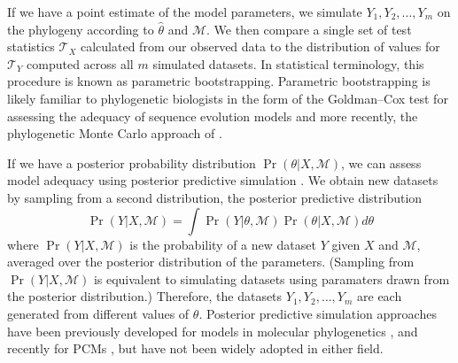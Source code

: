 \documentclass[a4paper,11pt]{article}
\begin{document}
If we have a point estimate of the model parameters, we simulate $Y_1, Y_2, \ldots, Y_m$ on the phylogeny according to $\hat{\theta}$ and $\mathcal{M}$. We then compare a single set of test statistics $\mathcal{T}_X$ calculated from our observed data to the distribution of values for $\mathcal{T}_Y$ computed across all $m$ simulated datasets. In statistical terminology, this procedure is known as parametric bootstrapping. Parametric bootstrapping is likely familiar to phylogenetic biologists in the form of the Goldman--Cox test \citep{Goldman} for assessing the adequacy of sequence evolution models and more recently, the phylogenetic Monte Carlo approach of \citet{Boettiger2012}.

If we have a posterior probability distribution $\Pr(\theta|X, \mathcal{M})$, we can assess model adequacy using posterior predictive simulation \citep{Rubin1984, Gelman1996}. We obtain new datasets by sampling from a second distribution, the posterior predictive distribution
\begin{equation}
\Pr(Y|X,\mathcal{M}) = \int \Pr(Y|\theta, \mathcal{M})\Pr(\theta |X,\mathcal{M})d\theta
\end{equation}
where $\Pr(Y|X,\mathcal{M})$ is the probability of a new dataset $Y$ given $X$ and $\mathcal{M}$, averaged over the posterior distribution of the parameters. (Sampling from $\Pr(Y|X,\mathcal{M})$ is equivalent to simulating datasets using paramaters drawn from the posterior distribution.) Therefore, the datasets $Y_1, Y_2, \ldots, Y_m$ are each generated from different values of $\theta$. Posterior predictive simulation approaches have been previously developed for models in molecular phylogenetics \citep{Bollback2002, Reid2013, Lewis2013, Brown2013}, and recently for PCMs \citep{SlaterPennell}, but have not been widely adopted in either field.

\end{document}
